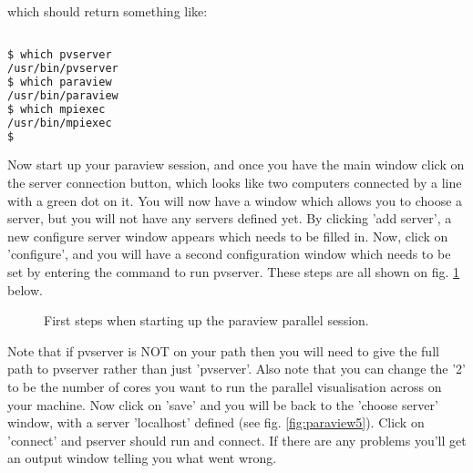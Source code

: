 which should return something like:

\begin{example}
  \begin{lstlisting}[language=bash]

$ which pvserver
/usr/bin/pvserver
$ which paraview
/usr/bin/paraview
$ which mpiexec
/usr/bin/mpiexec
$

\end{lstlisting}
\end{example}

Now start up your paraview session, and once you have the main window click on the server connection button, which looks like two computers connected by a line with a green dot on it. You will now have a window which allows you to choose a server, but you will not have any servers defined yet. By clicking 'add server', a new configure server window appears which needs to be filled in. Now, click on 'configure', and you will have a second configuration window which needs to be set by entering the command to run pvserver. These steps are all shown on fig. \ref{fig:paraview1} below.

\begin{figure}[h!]
 \centering
 \label{fig:paraview1}
\caption{First steps when starting up the paraview parallel session.}
\end{figure}
 

Note that if pvserver is NOT on your path then you will need to give the full path to pvserver rather than just 'pvserver'. Also note that you can change the '2' to be the number of cores you want to run the parallel visualisation across on your machine. Now click on 'save' and you will be back to the 'choose server' window, with a server 'localhost' defined (see fig. \ref{fig:paraview5}). Click on 'connect' and pserver should run and connect. If there are any problems you'll get an output window telling you what went wrong.

